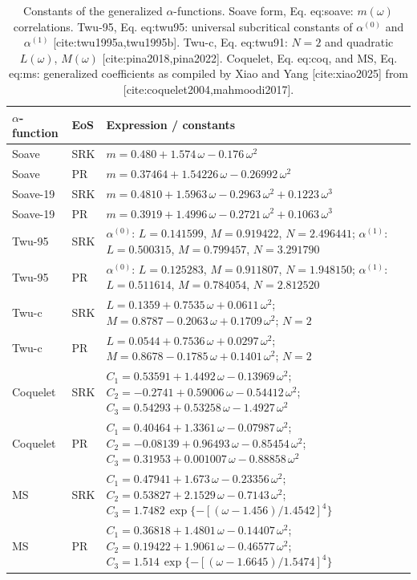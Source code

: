 \begin{table}[H]
\centering
\caption{Constants of the generalized $\alpha$-functions. Soave form, Eq. {eq:soave}: $m(\omega)$ correlations. Twu-95, Eq. {eq:twu95}: universal subcritical constants of $\alpha^{(0)}$ and $\alpha^{(1)}$ [cite:twu1995a,twu1995b]. Twu-c, Eq. {eq:twu91}: $N = 2$ and quadratic $L(\omega)$, $M(\omega)$ [cite:pina2018,pina2022]. Coquelet, Eq. {eq:coq}, and MS, Eq. {eq:ms}: generalized coefficients as compiled by Xiao and Yang [cite:xiao2025] from [cite:coquelet2004,mahmoodi2017].}
\label{tab:tabS_alpha_constants}
\small
\begin{tabular}{llp{9cm}}
\toprule
$\alpha$-function & EoS & Expression / constants \\
\midrule
Soave & SRK & $m = 0.480 + 1.574\,\omega - 0.176\,\omega^2$ \\
Soave & PR & $m = 0.37464 + 1.54226\,\omega - 0.26992\,\omega^2$ \\
Soave-19 & SRK & $m = 0.4810 + 1.5963\,\omega - 0.2963\,\omega^2 + 0.1223\,\omega^3$ \\
Soave-19 & PR & $m = 0.3919 + 1.4996\,\omega - 0.2721\,\omega^2 + 0.1063\,\omega^3$ \\
Twu-95 & SRK & $\alpha^{(0)}$: $L = 0.141599$, $M = 0.919422$, $N = 2.496441$; $\alpha^{(1)}$: $L = 0.500315$, $M = 0.799457$, $N = 3.291790$ \\
Twu-95 & PR & $\alpha^{(0)}$: $L = 0.125283$, $M = 0.911807$, $N = 1.948150$; $\alpha^{(1)}$: $L = 0.511614$, $M = 0.784054$, $N = 2.812520$ \\
Twu-c & SRK & $L = 0.1359 + 0.7535\,\omega + 0.0611\,\omega^2$; $M = 0.8787 - 0.2063\,\omega + 0.1709\,\omega^2$; $N = 2$ \\
Twu-c & PR & $L = 0.0544 + 0.7536\,\omega + 0.0297\,\omega^2$; $M = 0.8678 - 0.1785\,\omega + 0.1401\,\omega^2$; $N = 2$ \\
Coquelet & SRK & $C_1 = 0.53591 + 1.4492\,\omega - 0.13969\,\omega^2$; $C_2 = -0.2741 + 0.59006\,\omega - 0.54412\,\omega^2$; $C_3 = 0.54293 + 0.53258\,\omega - 1.4927\,\omega^2$ \\
Coquelet & PR & $C_1 = 0.40464 + 1.3361\,\omega - 0.07987\,\omega^2$; $C_2 = -0.08139 + 0.96493\,\omega - 0.85454\,\omega^2$; $C_3 = 0.31953 + 0.001007\,\omega - 0.88858\,\omega^2$ \\
MS & SRK & $C_1 = 0.47941 + 1.673\,\omega - 0.23356\,\omega^2$; $C_2 = 0.53827 + 2.1529\,\omega - 0.7143\,\omega^2$; $C_3 = 1.7482\,\exp\{-[(\omega - 1.456)/1.4542]^4\}$ \\
MS & PR & $C_1 = 0.36818 + 1.4801\,\omega - 0.14407\,\omega^2$; $C_2 = 0.19422 + 1.9061\,\omega - 0.46577\,\omega^2$; $C_3 = 1.514\,\exp\{-[(\omega - 1.6645)/1.5474]^4\}$ \\
\bottomrule
\end{tabular}
\end{table}
